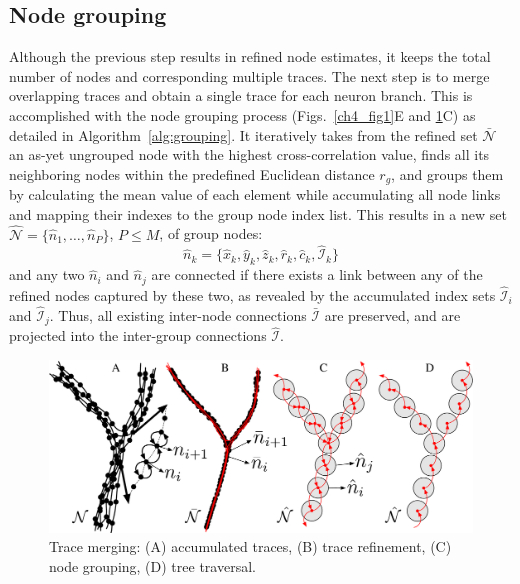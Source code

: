\subsection{Node grouping}
\label{subsec:node-grouping}
Although the previous step results in refined node estimates, it keeps the total number of nodes and corresponding multiple traces. The next step is to merge overlapping traces and obtain a single trace for each neuron branch. This is accomplished with the node grouping process (Figs.~\ref{ch4_fig1}E and \ref{ch4_fig4}C) as detailed in Algorithm~\ref{alg:grouping}. It iteratively takes from the refined set $\bar{\mathcal{N}}$ an as-yet ungrouped node with the highest cross-correlation value, finds all its neighboring nodes within the predefined Euclidean distance $r_g$, and groups them by calculating the mean value of each element while accumulating all node links and mapping their indexes to the group node index list. This results in a new set $\hat{\mathcal{N}} = \lbrace \hat{n}_1,\dots,\hat{n}_P \rbrace$, $P \leq M$, of group nodes:
\begin{equation}
\label{eq:hat_n_k}
\hat{n}_k=\lbrace\hat{x}_k, \hat{y}_k, \hat{z}_k, \hat{r}_k, \hat{c}_k, \hat{\mathcal{I}}_k\rbrace
\end{equation}
and any two $\hat{n}_i$ and $\hat{n}_j$ are connected if there exists a link between any of the refined nodes captured by these two, as revealed by the accumulated index sets $\hat{\mathcal{I}}_i$ and $\hat{\mathcal{I}}_j$. Thus, all existing inter-node connections $\bar{\mathcal{I}}$ are preserved, and are projected into the inter-group connections $\hat{\mathcal{I}}$.
\begin{figure}
	\centering
	\includegraphics[width=0.7\columnwidth]{fig4}
	\caption{Trace merging: (A) accumulated traces, (B) trace refinement, (C) node grouping, (D) tree traversal.}
	\label{ch4_fig4}
\end{figure}
